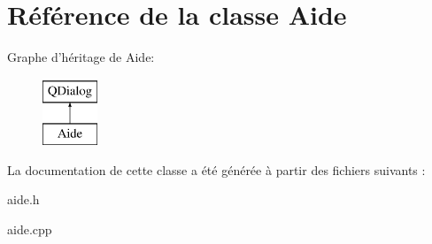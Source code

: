 \hypertarget{class_aide}{\section{Référence de la classe Aide}
\label{class_aide}
}
Graphe d'héritage de Aide\-:\begin{figure}[H]
\begin{center}
\leavevmode
\includegraphics[height=2.000000cm]{class_aide}
\end{center}
\end{figure}


La documentation de cette classe a été générée à partir des fichiers suivants \-:\begin{DoxyCompactItemize}
\item 
aide.\-h\item 
aide.\-cpp\end{DoxyCompactItemize}
